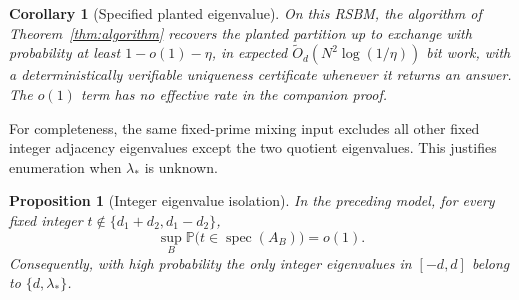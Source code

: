 \documentclass[11pt]{article}
\newtheorem{proposition}[theorem]{Proposition}
\newtheorem{corollary}[theorem]{Corollary}
\newcommand{\Prob}{\mathbb P}
\begin{document}
\begin{corollary}[Specified planted eigenvalue]\label{cor:known}
On this RSBM, the algorithm of Theorem~\ref{thm:algorithm} recovers
the planted partition up to exchange with probability at least
$1-o(1)-\eta$, in expected
$\widetilde O_d(N^2\log(1/\eta))$ bit work, with a deterministically
verifiable uniqueness certificate whenever it returns an answer.
The $o(1)$ term has no effective rate in the companion proof.
\end{corollary}

For completeness, the same fixed-prime mixing input excludes all
other fixed integer adjacency eigenvalues except the two quotient
eigenvalues. This justifies enumeration when $\lambda_*$ is unknown.

\begin{proposition}[Integer eigenvalue isolation]\label{prop:integer}
In the preceding model, for every fixed integer
$t\notin\{d_1+d_2,d_1-d_2\}$,
\[
 \sup_B\Prob\bigl(t\in\operatorname{spec}(A_B)\bigr)=o(1).
\]
Consequently, with high probability the only integer eigenvalues in
$[-d,d]$ belong to $\{d,\lambda_*\}$.
\end{proposition}
\end{document}
